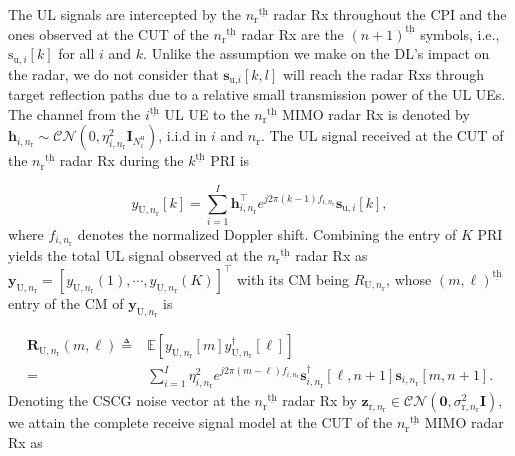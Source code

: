 \documentclass[9pt,journal]{IEEEtran}
\newcommand{\paren}[1]{\left({#1}\right)}
\newcommand{\bracket}[1]{{\left [{#1}\right ]}}
\newcommand{\ith}[1]    {{#1}^{\underline{\text{th}}}}
\newcommand{\rr}{_\mathrm{r}}
\newcommand{\rnr}{_{\mathrm{r},n_\mathrm{r}}}
\newcommand{\duin}{\mathbf{d}_{\textrm{u},i}\bracket{k,l}}
\newcommand{\PiB}{\mathbf{P}_{\textrm{u},i}\bracket{k}}
\theoremstyle{definition}
\begin{document}
The UL signals are intercepted by the $\ith{n\rr}$ radar Rx throughout the CPI and the ones observed at the CUT of the $\ith{n\rr}$ radar Rx are the $\ith{\paren{n+1}}$ symbols, i.e., $\mathrm{s}_{\textrm{u},i}\bracket{k}$ for all $i$ and $k$. 
Unlike the assumption we make on the DL's impact on the radar, we do not consider that $\mathbf{s}_{\textrm{u,}i}\bracket{k,l}$ will reach the radar Rxs through target reflection paths due to a relative small transmission power of the UL UEs. The channel from the $\ith{i}$ UL UE to the $\ith{n\rr}$ MIMO radar Rx is denoted by $\mathbf{h}_{i,n\rr}\sim\mathcal{CN}\paren{0,\eta^2_{i,n\rr}\mathbf{I}_{\mathit{N}^{\textrm{u}}_i}}$, i.i.d in $i$ and $n\rr$. 
The UL signal received at the CUT of the $\ith{n\rr}$ radar Rx during the $\ith{k}$ PRI is \par\noindent\small
\begin{equation}
y_{\textrm{U},n\rr}\bracket{k}=\sum_{i=1}^{\mathit{I}}\mathbf{h}^\top_{i,n\rr}e^{j2\pi(k-1) f_{i,n_\mathrm{r}}}\mathbf{s}_{\textrm{u},i}\bracket{k},
\end{equation}
where $f_{i,n_\mathrm{r}}$ denotes the normalized Doppler shift. Combining the entry of $\mathit{K}$ PRI yields the total UL signal observed at the $\ith{n\rr}$ radar Rx as  $\mathbf{y}_{\mathrm{U},n\rr}=\bracket{y_{\textrm{U},n\rr}\paren{1},\cdots,y_{\textrm{U},n\rr}\paren{\mathit{K}}}^\top$ with its CM being $\mathit{R}_{\mathrm{U},n\rr}$, whose
$\ith{\paren{m,\ell}}$ entry of the CM of $\mathbf{y}_{\mathrm{U},n\rr}$ is  \par\noindent\small
\begin{align}
\mathbf{R}_{\mathrm{U},n\rr}\paren{m,\ell}\triangleq&\mathbb{E}\bracket{y_{\mathrm{U},n\rr}\bracket{m}y^\dagger_{\mathrm{U},n\rr}\bracket{\ell}}\nonumber\\
=&\sum_{i=1}^{\mathit{I}}\eta^2_{i,n\rr}e^{j2\pi\paren{m-\ell}f_{i,n\rr}}\mathbf{s}^\dagger_{i,n\rr}\bracket{\ell,n+1}\mathbf{s}_{i,n\rr}\bracket{m,n+1}.\nonumber
\end{align}\normalsize
Denoting the CSCG noise vector at the $\ith{n\rr}$ radar Rx by $\mathbf{z}\rnr\in\mathcal{CN}\paren{\mathbf{0},\sigma^2\rnr\mathbf{I}}$, we attain the complete receive signal model at the CUT of the $\ith{n\rr}$ MIMO radar Rx as\par\noindent\small
\end{document}
